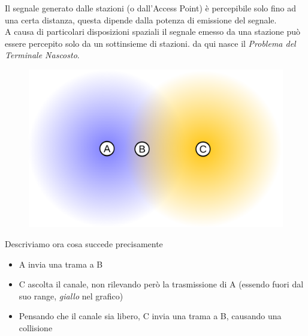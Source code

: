 \documentclass{article}
\newcounter{subsubsubsection}[subsubsection]
\begin{document}
                    Il segnale generato dalle stazioni (o dall'Access Point) è percepibile solo fino ad una certa distanza, questa dipende dalla potenza di emissione del segnale.\\
                    A causa di particolari disposizioni spaziali il segnale emesso da una stazione può essere percepito solo da un sottinsieme di stazioni. da qui nasce il \textit{Problema del Terminale Nascosto}.
                    \begin{figure}[H]
                        \centering
                        \includegraphics[width=\textwidth]{pic/terminale_nascosto.png}
                        \label{Problema del Termiale Nascosto}
                    \end{figure}
                    Descriviamo ora cosa succede precisamente
                    \begin{itemize}
                        \item A invia una trama a B
                        \item C ascolta il canale, non rilevando però la trasmissione di A (essendo fuori dal suo range, \textit{giallo} nel grafico)
                        \item Pensando che il canale sia libero, C invia una trama a B, causando una collisione
                    \end{itemize}
\end{document}
